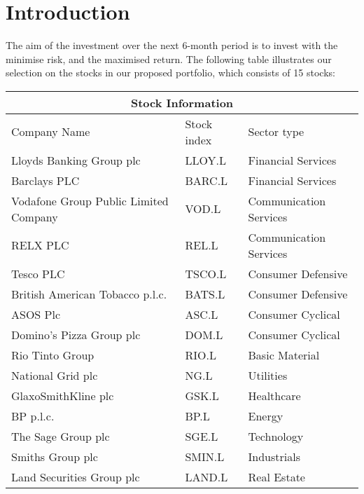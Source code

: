 
\section{Introduction}

The aim of the investment over the next 6-month period is to invest with the minimise risk, and the maximised return. The following table illustrates our selection on the stocks in our proposed portfolio, which consists of 15 stocks: \\

\setlength{\arrayrulewidth}{0.6mm}
\setlength{\tabcolsep}{20pt}
\renewcommand{\arraystretch}{2}


\begin{center}
\begin{tabular}{ |p{6cm}|p{2.5cm}|p{4.5cm}| }
\hline
\multicolumn{3}{|c|}{Stock Information} \\

\hline
Company Name& Stock index & Sector type \\
\hline
Lloyds Banking Group plc & LLOY.L & Financial Services  \\
\hline
Barclays PLC & BARC.L & Financial Services \\
\hline
Vodafone Group Public Limited Company & VOD.L & Communication Services \\
\hline
RELX PLC & REL.L & Communication Services \\
\hline
Tesco PLC & TSCO.L & Consumer Defensive \\
\hline
British American Tobacco p.l.c. & BATS.L & Consumer Defensive \\
\hline
ASOS Plc & ASC.L & Consumer Cyclical \\
\hline
Domino's Pizza Group plc & DOM.L & Consumer Cyclical \\
\hline
Rio Tinto Group & RIO.L & Basic Material \\
\hline
National Grid plc & NG.L & Utilities \\
\hline
GlaxoSmithKline plc & GSK.L & Healthcare \\
\hline
BP p.l.c. & BP.L & Energy \\
\hline
The Sage Group plc & SGE.L & Technology \\
\hline
Smiths Group plc & SMIN.L & Industrials \\
\hline
Land Securities Group plc & LAND.L & Real Estate \\
\hline
\end{tabular}
\end{center}



\newpage